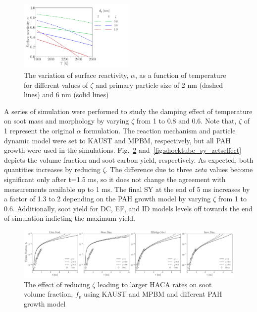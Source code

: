 \begin{figure}[H]
	\centering
	\includegraphics[width=0.5\textwidth]{Figures/Results/Shocktube/HACA/alpha.pdf}
	\caption{The variation of surface reactivity, $\alpha$, as a function of temperature for different values of $\zeta$ and primary particle size of 2 nm (dashed lines) and 6 nm (solid lines)}
	\label{fig:shocktube_alpha_HACA} 
\end{figure}

A series of simulation were performed to study the damping effect of temperature on soot mass and morphology by varying   $\zeta$ from 1 to 0.8 and 0.6. Note that, $\zeta$ of 1 represent the original $\alpha$ formulation. The reaction mechanism and particle dynamic model were set to KAUST and MPBM, respectively, but all PAH growth were used in the simulations.
Fig.~\ref{fig:shocktube_vf_zetseffect} and~\ref{fig:shocktube_sy_zetseffect} depicts the volume fraction and soot carbon yield, respectively. As expected, both quantities increases by reducing $\zeta$. The difference due to three $zeta$ values become significant only after t=1.5 ms, so it does not change the agreement with measurements available up to 1 ms. The final SY at the end of 5 ms increases by a factor of 1.3 to 2 depending on the PAH growth model by varying $\zeta$ from 1 to 0.6. Additionally, soot yield for DC, EF, and ID models levels off towards the end of simulation indicting the maximum yield.

\begin{figure}[H]
	\centering
	\includegraphics[width=1\textwidth]{Figures/Results/Shocktube/Stanford/TEM/vf_all_zetaeffect.pdf}
	\caption{The effect of reducing $\zeta$ leading to larger HACA rates on soot volume fraction, $f_v$ using KAUST and MPBM and different PAH growth model}
	\label{fig:shocktube_vf_zetseffect} 
\end{figure}


